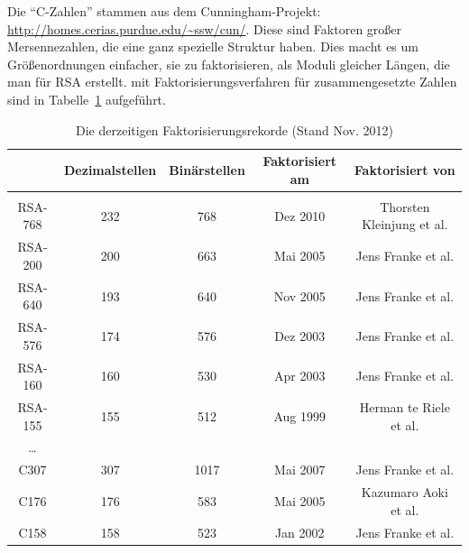 \begin{refsegment}
{Die "`C-Zahlen"' stammen aus dem Cunningham-Projekt:
\url{http://homes.cerias.purdue.edu/~ssw/cun/}.
Diese sind Faktoren großer Mersennezahlen, die eine ganz spezielle
Struktur haben. Dies macht es um Größenordnungen einfacher, sie zu
faktorisieren, als Moduli gleicher Längen, die man für RSA erstellt.
                               }
mit Faktorisierungsverfahren für zusammengesetzte Zahlen
sind in Tabelle~\ref{factorizationrecords} aufgeführt.


\begin{table}[ht]
\begin{center}
\begin{tabular}{|c|ccc@{}c|}
\hline
   & \textbf{Dezimalstellen} & \textbf{Binärstellen} & \textbf{Faktorisiert am} & \textbf{Faktorisiert von}\\
\hline
	&&&&\\
	RSA-768 & 	232 & 768 & Dez 2010 & Thorsten Kleinjung et al.\\
	RSA-200 & 	200 & 663 & Mai 2005 & Jens Franke et al.\\
	RSA-640\footnotemark & 	193 & 640 & Nov 2005 & Jens Franke et al.\\
	RSA-576 & 	174 & 576 & Dez 2003 & Jens Franke et al.\\
	RSA-160 & 	160 & 530 & Apr 2003 & Jens Franke et al.\\
	RSA-155	&	155 & 512 & Aug 1999 & Herman te Riele et al.\\
	\dots & & & &\\
	C307 & 		307 & 1017 & Mai 2007 & Jens Franke et al.\\
	C176 & 		176 & 583 & Mai 2005 & Kazumaro Aoki et al.\\
	C158 & 		158 & 523 & Jan 2002 & Jens Franke et al.\\
\hline
\end{tabular}
\caption{Die derzeitigen Faktorisierungsrekorde (Stand Nov. 2012)}  %
\label{factorizationrecords}
\end{center}
\end{table}
\end{refsegment}
